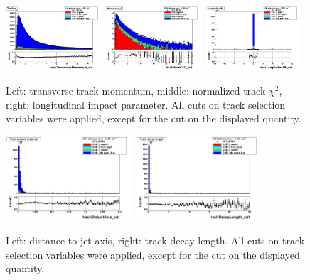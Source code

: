 \begin{figure}[h!]
\centering
\includegraphics[width=0.32\textwidth]{figures/trackTransverseMomentum_cut_Linear.png}
\includegraphics[width=0.32\textwidth]{figures/trackNormChi2_cut_Log.png}
\includegraphics[width=0.32\textwidth]{figures/trackLongitudinalIP_cut_Linear.png}
\caption{Left: transverse track momentum, middle: normalized track $\chi^2$, right: longitudinal impact parameter.   All cuts on track selection variables were applied, except for the cut on the displayed quantity.}
\label{fig:inputVars2N}
\end{figure}

\begin{figure}[h!]
\centering
\includegraphics[width=0.42\textwidth]{figures/trackDistJetAxis_cut_Linear.png}
\includegraphics[width=0.42\textwidth]{figures/trackDecayLength_cut_Linear.png}
\caption{Left: distance to jet axis, right: track decay length.  All cuts on track selection variables were applied, except for the cut on the displayed quantity. }
\label{fig:inputVars3N}
\end{figure}



